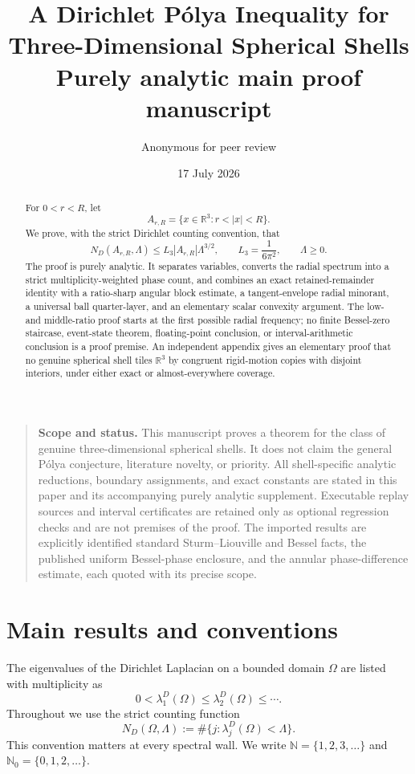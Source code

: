 \documentclass[11pt]{article}
\title{A Dirichlet P\'olya Inequality for\\Three-Dimensional Spherical Shells\\[0.4em]
\large Purely analytic main proof manuscript}
\author{Anonymous for peer review}
\date{17 July 2026}
\numberwithin{equation}{section}
\theoremstyle{definition}
\theoremstyle{remark}
\newcommand{\R}{\mathbb R}
\newcommand{\N}{\mathbb N}
\newcommand{\Nzero}{\mathbb N_0}
\begin{document}
\maketitle
\thispagestyle{titlepage}

\begin{quote}
\small
\textbf{Scope and status.}
This manuscript proves a theorem for the class of genuine three-dimensional
spherical shells.  It does not claim the general P\'olya conjecture,
literature novelty, or priority.  All shell-specific analytic reductions,
boundary assignments, and exact constants are stated in this paper and its
accompanying purely analytic supplement.  Executable replay sources and
interval certificates are retained only as optional regression checks and
are not premises of the proof.  The imported results are explicitly
identified standard Sturm--Liouville and Bessel facts, the published uniform
Bessel-phase enclosure, and the annular phase-difference estimate, each
quoted with its precise scope.
\end{quote}

\begin{abstract}
For \(0<r<R\), let
\[
  A_{r,R}=\{x\in\R^3:r<|x|<R\}.
\]
We prove, with the strict Dirichlet counting convention, that
\[
  N_D(A_{r,R},\Lambda)
  \le L_3|A_{r,R}|\Lambda^{3/2},
  \qquad
  L_3=\frac1{6\pi^2},
  \qquad \Lambda\ge0.
\]
The proof is purely analytic.  It separates variables, converts the radial
spectrum into a strict multiplicity-weighted phase count, and combines an
exact retained-remainder identity with a ratio-sharp angular block estimate,
a tangent-envelope radial minorant, a universal ball quarter-layer, and an
elementary scalar convexity argument.  The low- and middle-ratio proof starts
at the first possible radial frequency; no finite Bessel-zero staircase,
event-state theorem, floating-point conclusion, or interval-arithmetic
conclusion is a proof premise.  An independent appendix gives an elementary
proof that no genuine spherical shell tiles \(\R^3\) by congruent
rigid-motion copies with disjoint interiors, under either exact or
almost-everywhere coverage.
\end{abstract}

\tableofcontents
\clearpage

\section{Main results and conventions}

The eigenvalues of the Dirichlet Laplacian on a bounded domain \(\Omega\) are
listed with multiplicity as
\[
  0<\lambda_1^D(\Omega)\le\lambda_2^D(\Omega)\le\cdots.
\]
Throughout we use the strict counting function
\begin{equation}
  N_D(\Omega,\Lambda)
  :=\#\{j:\lambda_j^D(\Omega)<\Lambda\}.
  \label{eq:strict-count}
\end{equation}
This convention matters at every spectral wall.  We write
\(\N=\{1,2,3,\ldots\}\) and \(\Nzero=\{0,1,2,\ldots\}\).
\end{document}

